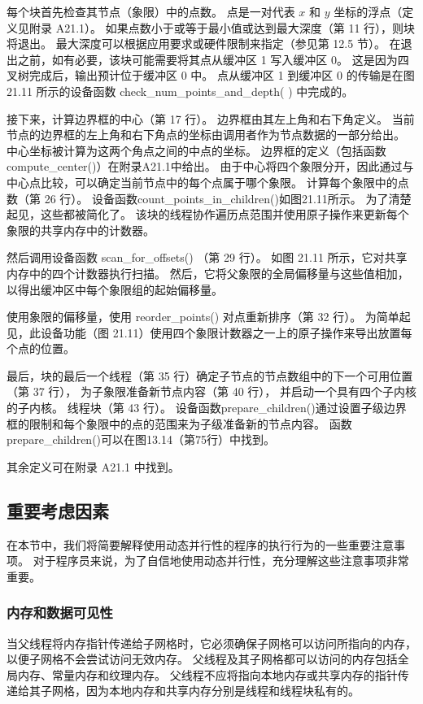 每个块首先检查其节点（象限）中的点数。 点是一对代表 $x$ 和 $y$ 坐标的浮点（定义见附录 A21.1）。 
如果点数小于或等于最小值或达到最大深度（第 11 行），则块将退出。 
最大深度可以根据应用要求或硬件限制来指定（参见第 12.5 节）。 
在退出之前，如有必要，该块可能需要将其点从缓冲区 1 写入缓冲区 0。 
这是因为四叉树完成后，输出预计位于缓冲区 0 中。 
点从缓冲区 1 到缓冲区 0 的传输是在图 21.11 所示的设备函数 check\_num\_points\_and\_depth( ) 中完成的。

接下来，计算边界框的中心（第 17 行）。 边界框由其左上角和右下角定义。 
当前节点的边界框的左上角和右下角点的坐标由调用者作为节点数据的一部分给出。 中心坐标被计算为这两个角点之间的中点的坐标。 
边界框的定义（包括函数compute\_center()）在附录A21.1中给出。 
由于中心将四个象限分开，因此通过与中心点比较，可以确定当前节点中的每个点属于哪个象限。 计算每个象限中的点数（第 26 行）。 
设备函数count\_points\_in\_children()如图21.11所示。 为了清楚起见，这些都被简化了。 
该块的线程协作遍历点范围并使用原子操作来更新每个象限的共享内存中的计数器。

然后调用设备函数 scan\_for\_offsets() （第 29 行）。 如图 21.11 所示，它对共享内存中的四个计数器执行扫描。 
然后，它将父象限的全局偏移量与这些值相加，以得出缓冲区中每个象限组的起始偏移量。

使用象限的偏移量，使用 reorder\_points() 对点重新排序（第 32 行）。 
为简单起见，此设备功能（图 21.11）使用四个象限计数器之一上的原子操作来导出放置每个点的位置。

最后，块的最后一个线程（第 35 行）确定子节点的节点数组中的下一个可用位置（第 37 行），
为子象限准备新节点内容（第 40 行），
并启动一个具有四个子内核的子内核。 线程块（第 43 行）。 
设备函数prepare\_children()通过设置子级边界框的限制和每个象限中的点的范围来为子级准备新的节点内容。 
函数prepare\_children()可以在图13.14（第75行）中找到。

其余定义可在附录 A21.1 中找到。

\subsection{重要考虑因素}
在本节中，我们将简要解释使用动态并行性的程序的执行行为的一些重要注意事项。 
对于程序员来说，为了自信地使用动态并行性，充分理解这些注意事项非常重要。

\subsubsection{内存和数据可见性}
当父线程将内存指针传递给子网格时，它必须确保子网格可以访问所指向的内存，以便子网格不会尝试访问无效内存。 
父线程及其子网格都可以访问的内存包括全局内存、常量内存和纹理内存。 
父线程不应将指向本地内存或共享内存的指针传递给其子网格，因为本地内存和共享内存分别是线程和线程块私有的。

